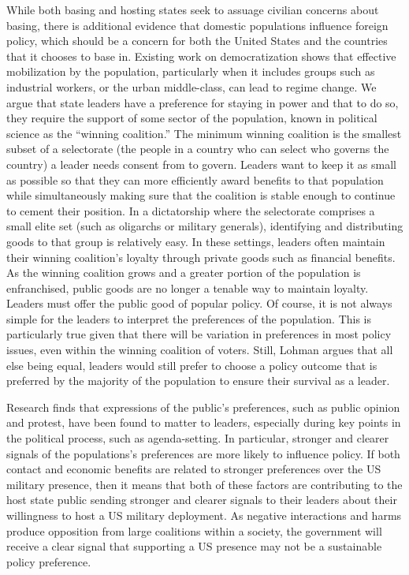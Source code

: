 While both basing and hosting states seek to assuage civilian concerns about basing, there is additional evidence that domestic populations influence foreign policy, which should be a concern for both the United States and the countries that it chooses to base in.\autocite{Justwan2017,Justwan2017b} Existing work on democratization shows that effective mobilization by the population, particularly when it includes groups such as industrial workers, or the urban middle-class, can lead to regime change.\autocite{Dahlum2019} We argue that state leaders have a preference for staying in power and that to do so, they require the support of some sector of the population, known in political science as the ``winning coalition.''\autocite{demesquita2005} The minimum winning coalition is the smallest subset of a selectorate  (the people in a country who can select who governs the country) a leader needs consent from to govern. Leaders want to keep it as small as possible so that they can more efficiently award benefits to that population while simultaneously making sure that the coalition is stable enough to continue to cement their position. In a dictatorship where the selectorate comprises a small elite set (such as oligarchs or military generals), identifying and distributing goods to that group is relatively easy. In these settings, leaders often maintain their winning coalition's loyalty through private goods such as financial benefits. As the winning coalition grows and a greater portion of the population is enfranchised, public goods are no longer a tenable way to maintain loyalty. Leaders must offer the public good of popular policy.\autocite{demesquita2005} Of course, it is not always simple for the leaders to interpret the preferences of the population. This is particularly true given that there will be variation in preferences in most policy issues, even within the winning coalition of voters.\autocite{Lohmann1993} Still, Lohman argues that all else being equal, leaders would still prefer to choose a policy outcome that is preferred by the majority of the population to ensure their survival as a leader.\autocite{Lohmann1993} 


Research finds that expressions of the public's preferences, such as public opinion and protest, have been found to matter to leaders, especially during key points in the political process, such as agenda-setting.\autocite{Baumgartner2015} In particular, stronger and clearer signals of the populations's preferences are more likely to influence policy.\autocite{Fassiotto2017} If both contact and economic benefits are related to stronger preferences over the US military presence, then it means that both of these factors are contributing to the host state public sending stronger and clearer signals to their leaders about their willingness to host a US military deployment. As negative interactions and harms produce opposition from large coalitions within a society, the government will receive a clear signal that supporting a US presence may not be a sustainable policy preference. 

